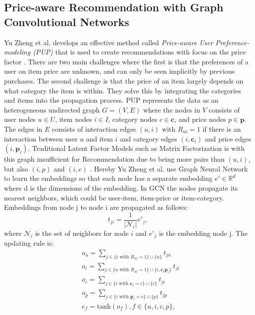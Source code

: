 \subsection{Price-aware Recommendation with Graph Convolutional Networks}
Yu Zheng et al. develops an effective method called \textit{Price-aware User Preference-modeling (PUP)} that is used to create recommendations with focus on the price factor \cite{Priceaware}.
There are two main challenges where the first is that the preferences of a user on item price are unknown, and can only be seen implicitly by previous purchases.
The second challenge is that the price of an item largely depends on what category the item is within.
They solve this by integrating the categories and items into the propagation process.
PUP represents the data as an heterogeneous undirected graph $G = (V,E)$ where the nodes in $V$ consists of user nodes $u \in U$, item nodes $i \in I$, category nodes $c \in \textbf{c}$, and price nodes $p \in \textbf{p}$.
The edges in $E$ consists of interaction edges $(u, i)$ with $R_{ui} = 1$ if there is an interaction between user $u$ and item $i$ and category edges $(i, \textbf{c}_i)$ and price edges $(i, \textbf{p}_i)$.
Traditional Latent Factor Models such as Matrix Factorization is with this graph insufficient for Recommendation due to being more pairs than $(u,i)$, but also $(i,p)$ and $(i,c)$ \cite{Priceaware}.
Hereby Yu Zheng et al. use Graph Neural Network to learn the embeddings so that each node has a separate embedding $e' \in \mathbb{R}^d$ where d is the dimensions of the embedding.
In GCN the nodes propagate its nearest neighbors, which could be user-item, item-price or item-category.
Embeddings from node j to node i are propagated as follows:
\begin{equation}
    t_{ji} = \frac{1}{|\mathcal{N}_i|}e'_j,
\end{equation}
where $\mathcal{N}_i$ is the set of neighbors for node $i$ and $e'_j$ is the embedding node j.
The updating rule is:
\begin{align*}
     & o_u = \sum_{j \in \{i \textrm{ with } R_{ui}=1 \} \cup \{ u\}}^{} t_{ju}                            \\
     & o_i = \sum_{j \in \{u \textrm{ with } R_{ui}=1 \} \cup \{ i, \textbf{c}_i \textbf{p}_i\}}^{} t_{ji} \\
     & o_c = \sum_{j \in \{i \textrm{ with } \textbf{c}_i=c \} \cup \{ c\}}^{} t_{jc}                      \\
     & o_p = \sum_{j \in \{i \textrm{ with } \textbf{p}_i=c \} \cup \{ p\}}^{} t_{jp}                      \\
     & e_f = \textrm{tanh}(o_f), f \in \{u, i, c, p\},
\end{align*}
